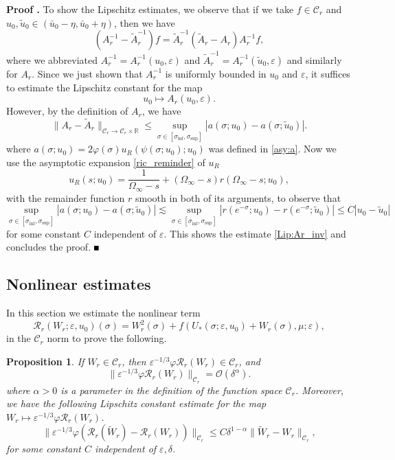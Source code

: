 \documentclass[letterpaper,11pt]{article}
\newcommand{\rmO}{\mathcal{O}}
\newcommand{\eps}{\varepsilon}
\newcommand{\lar}{ \lesssim }
\numberwithin{equation}{section}
\theoremstyle{plain}
\newtheorem{Proposition}[Lemma]{Proposition}
\newenvironment{Proof}[1][\unskip]%
 {\begin{trivlist} \item[]{\bf Proof #1. }}%
 {\hspace*{\fill}$\rule{.4\baselineskip}{.4\baselineskip}$\end{trivlist}}
\begin{document}
\begin{Proof}
To show the Lipschitz estimates, we observe that if we take $f \in \mathcal{C}_r$ and $u_0, \tilde{u}_0 \in (\bar{u}_0-\eta, \bar{u}_0+\eta)$, then we have
\[
(A_r^{-1} -\tilde{A}_r^{-1})f = \tilde{A}_r^{-1}(\tilde{A}_r-A_r)A_r^{-1}f,
\]
where we abbreviated $A_r^{-1} = A_r^{-1}(u_0,\eps)$ and $\tilde{A}_r^{-1} = A_r^{-1}(\tilde{u}_0,\eps)$ and similarly for $A_r$. Since we just shown that $A_r^{-1}$ is uniformly bounded in $u_0$ and $\eps$, it suffices to estimate the Lipschitz constant for the map
\[
u_0 \mapsto A_r(u_0,\eps).
\]
However, by the definition of $A_r$, we have
\[
\|A_r-\tilde{A}_r\|_{\mathcal{C}_r\to \mathcal{C}_r\times \mathbb{R}} \le  \sup_{\sigma \in [\sigma_{\inf},\sigma_{\sup}]} |a(\sigma;u_0) - a(\sigma;\tilde{u}_0)|.
\]
where $a(\sigma; u_0) =  2\varphi(\sigma)u_R(\psi(\sigma;u_0);u_0)$ was defined in \eqref{asy:a}. Now we use the asymptotic expansion \eqref{ric_reminder} of $u_R$
\[
u_R(s;u_0) = \frac{1}{\Omega_\infty-s} +  (\Omega_\infty-s) r(\Omega_\infty-s;u_0),
\]
with the remainder function $r$ smooth in both of its arguments, to observe that
\[
\sup_{\sigma \in [\sigma_{\inf},\sigma_{\sup}]} |a(\sigma;u_0) - a(\sigma;\tilde{u}_0)|\lar 
\sup_{\sigma \in [\sigma_{\inf},\sigma_{\sup}]} |r(e^{-\sigma};u_0)-r(e^{-\sigma};\tilde{u}_0)|\le C|u_0-\tilde{u}_0|
\] 
for some constant $C$ independent of $\eps$. This shows the estimate \eqref{Lip:Ar_inv} and concludes the proof.
\end{Proof}

\subsection{Nonlinear estimates}

In this section we estimate the nonlinear term
\[
\mathcal{R}_r(W_r;\eps,u_0)(\sigma) = W_r^2(\sigma) + f(U_*(\sigma;\eps,u_0)+W_r(\sigma), \mu ; \eps),
\]
in the $\mathcal{C}_r$ norm to prove the following.
\begin{Proposition}\label{nl_est_r}
If $W_r \in \mathcal{C}_{r}$, then $\eps^{-1/3}\varphi \mathcal{R}_r(W_r) \in \mathcal{C}_{r}$, and
\begin{equation}\label{nl_est:Rr}
\|\eps^{-1/3}\varphi \mathcal{R}_r(W_r) \|_{\mathcal{C}_r} = \rmO(\delta^{\alpha}).
\end{equation}
where $\alpha>0$ is a parameter in the definition of the function space $\mathcal{C}_r$.
Moreover, we have the following Lipschitz constant estimate for the map $W_r \mapsto \eps^{-1/3}\varphi\mathcal{R}_r(W_r)$.
\begin{equation}\label{Lip_est:Rr}
\|\eps^{-1/3}\varphi(\mathcal{R}_r(\widetilde{W}_r) - \mathcal{R}_r(W_r)) \|_{\mathcal{C}_r}\le C\delta^{1-\alpha} \|\widetilde{W}_r - W_r \|_{\mathcal{C}_r},
\end{equation}
for some constant $C$ independent of $\eps, \delta$.
\end{Proposition}
\end{document}
